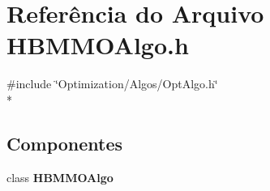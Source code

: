 \section{Referência do Arquivo H\+B\+M\+M\+O\+Algo.\+h}
\label{_h_b_m_m_o_algo_8h}
{\ttfamily \#include \char`\"{}Optimization/\+Algos/\+Opt\+Algo.\+h\char`\"{}}\\*
\subsection*{Componentes}
\begin{DoxyCompactItemize}
\item 
class {\bf H\+B\+M\+M\+O\+Algo}
\end{DoxyCompactItemize}
